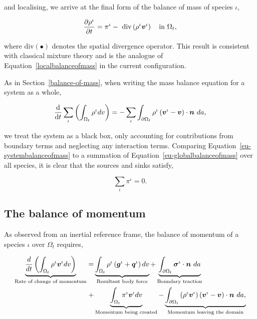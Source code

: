 \noindent and localising, we arrive at the final form of the balance of
mass of species $\iota$,

\begin{equation}
\frac{\partial \rho^{\iota}}{\partial t}  =
\pi^{\iota}
-\ \mathrm{div} \left(\rho^{\iota} \mbox{\boldmath$ v$}^{\iota}\right)
\quad \mathrm{in}\ \Omega_{t},
\label{eu-localbalanceofmass}
\end{equation}

\noindent where $\mathrm{div} (\bullet)$ denotes the spatial divergence
operator. This result is consistent with classical mixture theory
\citep{TruesdellToupin:60} and is the analogue of
Equation~\ref{localbalanceofmass} in the current configuration.

As in Section~\ref{balance-of-mass}, when writing the mass balance
equation for a system as a whole,

\begin{equation}
\frac{\mathrm{d}}{\mathrm{d}t}\sum\limits_{\iota} \left(\int_{\Omega_{t}} \rho^{\iota} dv
  \right) = -\sum\limits_{\iota} \int_{\partial \Omega_{t}} \rho^{\iota}
  \left(\mbox{\boldmath$ v$}^{\iota} - \mbox{\boldmath$ v$}\right) \cdot \mbox{\boldmath$ n$}\ da,
\label{eu-systembalanceofmass}
\end{equation}

\noindent we treat the system as a black box, only accounting for
contributions from boundary terms and neglecting any interaction
terms. Comparing Equation~\ref{eu-systembalanceofmass} to a summation
of Equation~\ref{eu-globalbalanceofmass} over all species, it is clear
that the sources and sinks satisfy,

\begin{equation}
\sum\limits_{\iota}\pi^{\iota} = 0.
\label{eu-summationrelationmass}
\end{equation}

\subsection{The balance of momentum}
\label{eu-balance-of-momentum}

As observed from an inertial reference frame, the balance of momentum
of a species $\iota$ over $\Omega_{t}$ requires,

\begin{equation}
\begin{split}
\underbrace{\frac{d}{dt}\left(\int_{\Omega_{t}} \rho^{\iota}
  \mbox{\boldmath$ v$}^{\iota} dv \right)}_{\text{Rate of change of momentum}}  = 
& \underbrace{\int_{\Omega_{t}} \rho^{\iota} \left(\mbox{\boldmath$ g$}^{\iota} +
  \mbox{\boldmath$ q$}^{\iota}\right) dv}_{\text{Resultant body force}} 
+ \underbrace{\int_{\partial \Omega_{t}}
  \mbox{\boldmath$\sigma$}^{\iota}\cdot\mbox{\boldmath$ n$}\ da}_{\text{Boundary traction}}\\ 
+ & \underbrace{\int_{\Omega_{t}} \pi^{\iota}\mbox{\boldmath$ v$}^{\iota}
  dv}_{\text{Momentum being created}}
- \underbrace{\int_{\partial \Omega_{t}} \left(\rho^{\iota}
  \mbox{\boldmath$ v$}^{\iota} \right) \left(\mbox{\boldmath$ v$}^{\iota} -
\mbox{\boldmath$ v$}\right) \cdot \mbox{\boldmath$ n$}\ da,}_{\text{Momentum leaving the domain}} 
\end{split}
\label{eu-globalbalanceofmomentum}
\end{equation}

